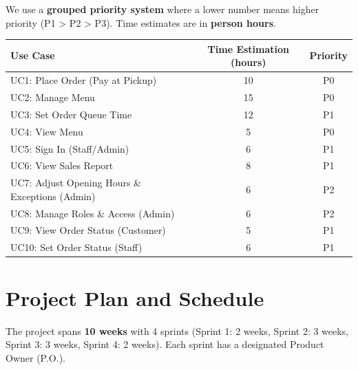 \documentclass{article}
\begin{document}
We use a \textbf{grouped priority system} where a lower number means higher priority (P1 > P2 > P3).
Time estimates are in \textbf{person hours}.
\begin{center}
\begin{adjustbox}{max width=\textwidth}
\begin{tabular}{|l|c|c|}
\hline
\textbf{Use Case} & \textbf{Time Estimation (hours)} & \textbf{Priority} \\ \hline
UC1: Place Order (Pay at Pickup)                 & 10 & P0 \\ \hline
UC2: Manage Menu                                 & 15 & P0 \\ \hline
UC3: Set Order Queue Time                        & 12 & P1 \\ \hline
UC4: View Menu                                   & 5  & P0 \\ \hline
UC5: Sign In (Staff/Admin)                       & 6  & P1 \\ \hline
UC6: View Sales Report                           & 8  & P1 \\ \hline
UC7: Adjust Opening Hours \& Exceptions (Admin)  & 6  & P2 \\ \hline
UC8: Manage Roles \& Access (Admin)              & 6  & P2 \\ \hline
UC9: View Order Status (Customer)                & 5  & P1 \\ \hline
UC10: Set Order Status (Staff)                   & 6  & P1 \\ \hline
\end{tabular}
\end{adjustbox}
\end{center}

\section{Project Plan and Schedule}

The project spans \textbf{10 weeks} with 4 sprints (Sprint 1: 2 weeks, Sprint 2: 3 weeks, Sprint 3: 3 weeks, Sprint 4: 2 weeks).
Each sprint has a designated Product Owner (P.O.).
\end{document}
